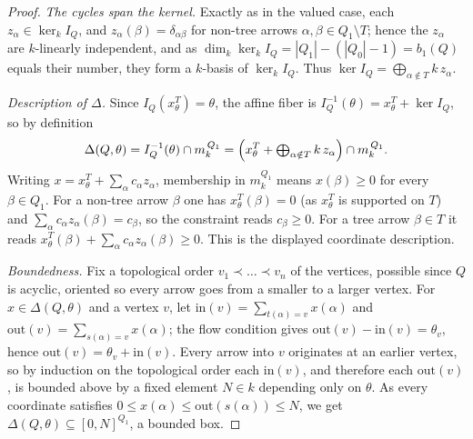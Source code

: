 \documentclass[12pt]{amsart}
\theoremstyle{plain}
\theoremstyle{definition}
\begin{document}
\begin{proof}
\emph{The cycles span the kernel.} Exactly as in the valued case, each
$z_\alpha \in \ker_k I_Q$, and $z_\alpha(\beta) = \delta_{\alpha\beta}$ for
non-tree arrows $\alpha,\beta \in Q_1\setminus T$; hence the $z_\alpha$ are
$k$-linearly independent, and as
$\dim_k \ker_k I_Q = |Q_1| - (|Q_0|-1) = b_1(Q)$ equals their number, they form a
$k$-basis of $\ker_k I_Q$. Thus $\ker I_Q = \bigoplus_{\alpha\notin T} k\,z_\alpha$.

\emph{Description of $\Delta$.} Since $I_Q(x^T_\theta) = \theta$, the affine fiber
is $I_Q^{-1}(\theta) = x^T_\theta + \ker I_Q$, so by definition
\[
  \Delta(Q,\theta) = I_Q^{-1}(\theta) \cap m_k^{\,Q_1}
    = \Bigl(x^T_\theta + \textstyle\bigoplus_{\alpha\notin T} k\,z_\alpha\Bigr)
      \cap m_k^{\,Q_1}.
\]
Writing $x = x^T_\theta + \sum_{\alpha} c_\alpha z_\alpha$, membership in
$m_k^{Q_1}$ means $x(\beta)\ge 0$ for every $\beta \in Q_1$. For a non-tree arrow
$\beta$ one has $x^T_\theta(\beta)=0$ (as $x^T_\theta$ is supported on $T$) and
$\sum_\alpha c_\alpha z_\alpha(\beta) = c_\beta$, so the constraint reads
$c_\beta \ge 0$. For a tree arrow $\beta \in T$ it reads
$x^T_\theta(\beta) + \sum_\alpha c_\alpha z_\alpha(\beta) \ge 0$. This is the
displayed coordinate description.

\emph{Boundedness.} Fix a topological order $v_1 \prec \dots \prec v_n$ of the
vertices, possible since $Q$ is acyclic, oriented so every arrow goes from a
smaller to a larger vertex. For $x \in \Delta(Q,\theta)$ and a vertex $v$, let
$\mathrm{in}(v) = \sum_{t(\alpha)=v} x(\alpha)$ and
$\mathrm{out}(v) = \sum_{s(\alpha)=v} x(\alpha)$; the flow condition gives
$\mathrm{out}(v) - \mathrm{in}(v) = \theta_v$, hence
$\mathrm{out}(v) = \theta_v + \mathrm{in}(v)$. Every arrow into $v$ originates at
an earlier vertex, so by induction on the topological order each $\mathrm{in}(v)$,
and therefore each $\mathrm{out}(v)$, is bounded above by a fixed element
$N \in k$ depending only on $\theta$. As every coordinate satisfies
$0 \le x(\alpha) \le \mathrm{out}(s(\alpha)) \le N$, we get
$\Delta(Q,\theta) \subseteq [0,N]^{Q_1}$, a bounded box.

\end{proof}
\end{document}
